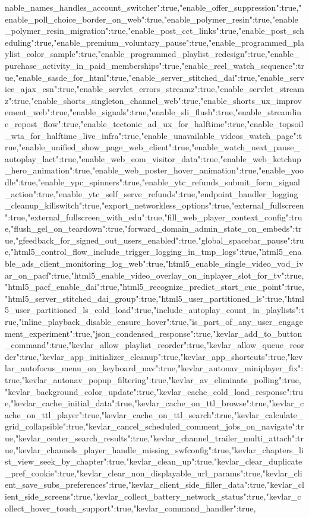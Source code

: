 {nable_names_handles_account_switcher":true,"enable_offer_suppression":true,"enable_poll_choice_border_on_web":true,"enable_polymer_resin":true,"enable_polymer_resin_migration":true,"enable_post_cct_links":true,"enable_post_scheduling":true,"enable_premium_voluntary_pause":true,"enable_programmed_playlist_color_sample":true,"enable_programmed_playlist_redesign":true,"enable_purchase_activity_in_paid_memberships":true,"enable_reel_watch_sequence":true,"enable_sasde_for_html":true,"enable_server_stitched_dai":true,"enable_service_ajax_csn":true,"enable_servlet_errors_streamz":true,"enable_servlet_streamz":true,"enable_shorts_singleton_channel_web":true,"enable_shorts_ux_improvement_web":true,"enable_signals":true,"enable_sli_flush":true,"enable_streamline_repost_flow":true,"enable_tectonic_ad_ux_for_halftime":true,"enable_topsoil_wta_for_halftime_live_infra":true,"enable_unavailable_videos_watch_page":true,"enable_unified_show_page_web_client":true,"enable_watch_next_pause_autoplay_lact":true,"enable_web_eom_visitor_data":true,"enable_web_ketchup_hero_animation":true,"enable_web_poster_hover_animation":true,"enable_yoodle":true,"enable_ypc_spinners":true,"enable_ytc_refunds_submit_form_signal_action":true,"enable_ytc_self_serve_refunds":true,"endpoint_handler_logging_cleanup_killswitch":true,"export_networkless_options":true,"external_fullscreen":true,"external_fullscreen_with_edu":true,"fill_web_player_context_config":true,"flush_gel_on_teardown":true,"forward_domain_admin_state_on_embeds":true,"gfeedback_for_signed_out_users_enabled":true,"global_spacebar_pause":true,"html5_control_flow_include_trigger_logging_in_tmp_logs":true,"html5_enable_ads_client_monitoring_log_web":true,"html5_enable_single_video_vod_ivar_on_pacf":true,"html5_enable_video_overlay_on_inplayer_slot_for_tv":true,"html5_pacf_enable_dai":true,"html5_recognize_predict_start_cue_point":true,"html5_server_stitched_dai_group":true,"html5_user_partitioned_ls":true,"html5_user_partitioned_ls_cold_load":true,"include_autoplay_count_in_playlists":true,"inline_playback_disable_ensure_hover":true,"is_part_of_any_user_engagement_experiment":true,"json_condensed_response":true,"kevlar_add_to_button_command":true,"kevlar_allow_playlist_reorder":true,"kevlar_allow_queue_reorder":true,"kevlar_app_initializer_cleanup":true,"kevlar_app_shortcuts":true,"kevlar_autofocus_menu_on_keyboard_nav":true,"kevlar_autonav_miniplayer_fix":true,"kevlar_autonav_popup_filtering":true,"kevlar_av_eliminate_polling":true,"kevlar_background_color_update":true,"kevlar_cache_cold_load_response":true,"kevlar_cache_initial_data":true,"kevlar_cache_on_ttl_browse":true,"kevlar_cache_on_ttl_player":true,"kevlar_cache_on_ttl_search":true,"kevlar_calculate_grid_collapsible":true,"kevlar_cancel_scheduled_comment_jobs_on_navigate":true,"kevlar_center_search_results":true,"kevlar_channel_trailer_multi_attach":true,"kevlar_channels_player_handle_missing_swfconfig":true,"kevlar_chapters_list_view_seek_by_chapter":true,"kevlar_clean_up":true,"kevlar_clear_duplicate_pref_cookie":true,"kevlar_clear_non_displayable_url_params":true,"kevlar_client_save_subs_preferences":true,"kevlar_client_side_filler_data":true,"kevlar_client_side_screens":true,"kevlar_collect_battery_network_status":true,"kevlar_collect_hover_touch_support":true,"kevlar_command_handler":true,}
